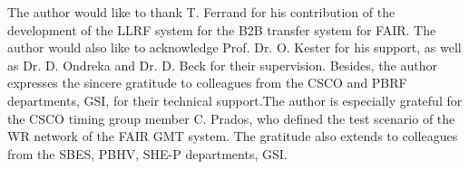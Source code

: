 The author would like to thank T. Ferrand for his contribution of the development of the LLRF system for the B2B transfer system for FAIR. The author would also like to acknowledge Prof. Dr. O. Kester for his support, as well as Dr. D. Ondreka and Dr. D. Beck for their supervision. Besides, the author expresses the sincere gratitude to colleagues from the CSCO and PBRF departments, GSI, for their technical support.The author is especially grateful for the CSCO timing group member C. Prados, who defined the test scenario of the WR network of the FAIR GMT system. The gratitude also extends to colleagues from the SBES, PBHV, SHE-P departments, GSI. 